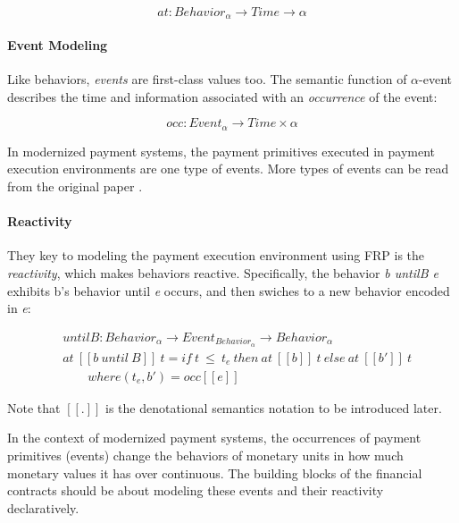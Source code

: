 \begin{equation}
    at : Behavior_{\alpha} \rightarrow Time \rightarrow \alpha
\end{equation}

\paragraph{Event Modeling}

Like behaviors, \textit{events} are first-class values too. The semantic function of $\alpha$-event describes the time and
information associated with an \textit{occurrence} of the event:

\begin{equation}
    occ : Event_{\alpha} \rightarrow Time \times \alpha
\end{equation}

In modernized payment systems, the payment primitives executed in payment execution environments are one type of
events. More types of events can be read from the original paper .

\paragraph{Reactivity}

They key to modeling the payment execution environment using FRP is the \textit{reactivity}, which makes behaviors
reactive. Specifically, the behavior \textit{b untilB e} exhibits b's behavior until \textit{e} occurs, and then swiches
to a new behavior encoded in \textit{e}:

\begin{equation}
    \begin{split}
    &untilB : Behavior_{\alpha} \rightarrow Event_{Behavior_{\alpha}} \rightarrow Behavior_{\alpha} \\
    &at\ [\![b\ until\ B]\!]\ t = if\ t\ \leq\ t_{e}\ then\ at\ [\![b]\!]\ t\ else\ at\ [\![b']\!]\ t \\
    &\qquad where (t_e, b') = occ[\![e]\!]
    \end{split}
\end{equation}

Note that $[\![.]\!]$ is the denotational semantics notation to be introduced later.

In the context of modernized payment systems, the occurrences of payment primitives (events) change the behaviors of
monetary units in how much monetary values it has over continuous. The building blocks of the financial contracts should
be about modeling these events and their reactivity declaratively.

